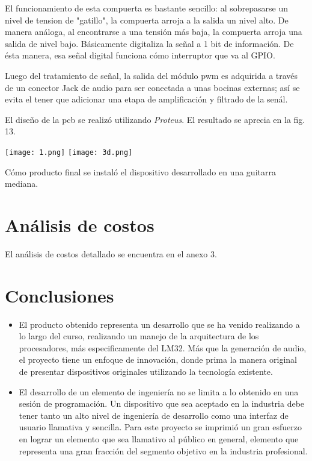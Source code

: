 \documentclass[12pt,journal]{IEEEtran}
\begin{document}
El funcionamiento de esta compuerta es bastante sencillo: al sobrepasarse un nivel de tension de "gatillo", la compuerta arroja a la salida un nivel alto. De manera an\'aloga, al encontrarse a una tensi\'on m\'as baja, la compuerta arroja una salida de nivel bajo. B\'asicamente digitaliza la señal a 1 bit de informaci\'on. De \'esta manera, esa se\~nal digital funciona c\'omo interruptor que va al GPIO. \par

Luego del tratamiento de se\~nal, la salida del m\'odulo pwm es adquirida a trav\'es de un conector Jack de audio para ser conectada a unas bocinas externas; as\'i se evita el tener que adicionar una etapa de amplificaci\'on y filtrado de la sen\'al.

El dise\~no de la pcb se realiz\'o utilizando \emph{Proteus}. El resultado se aprecia en la fig. 13.
\begin{center}
	\texttt{[image: 1.png]}
	\texttt{[image: 3d.png]}
\end{center}
 
C\'omo producto final se instal\'o el dispositivo desarrollado en una guitarra mediana. 

\section{An\'alisis de costos}
El an\'alisis de costos detallado se encuentra en el anexo 3.

\section{Conclusiones}
\begin{itemize}
	\item El producto obtenido representa un desarrollo que se ha venido realizando a lo largo del curso, realizando un manejo de la arquitectura de los procesadores, más especificamente del LM32. Más que la generaci\'on de audio, el proyecto tiene un enfoque de innovaci\'on, donde prima la manera original de presentar dispositivos originales utilizando la tecnolog\'ia existente.
	\item El desarrollo de un elemento de ingenier\'ia no se limita a lo obtenido en una sesi\'on de programaci\'on. Un dispositivo que sea aceptado en la industria debe tener tanto un alto nivel de ingenier\'ia de desarrollo como una interfaz de usuario llamativa y sencilla. Para este proyecto se imprimi\'o un gran esfuerzo en lograr un elemento que sea llamativo al p\'ublico en general, elemento que representa una gran fracci\'on del segmento objetivo en la industria profesional.
\end{itemize}
\end{document}
